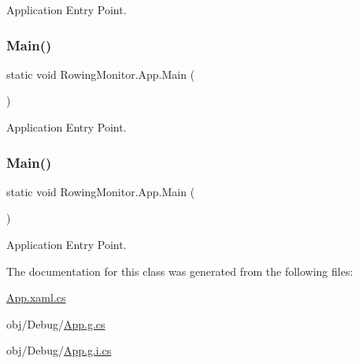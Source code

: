 Application Entry Point. 

\mbox{\label{class_rowing_monitor_1_1_app_a3cb5b8569d044cd9687827e6c2072b7e}} 
\subsubsection{\texorpdfstring{Main()}{Main()}\hspace{0.1cm}{\footnotesize\ttfamily [3/4]}}
{\footnotesize\ttfamily static void Rowing\+Monitor.\+App.\+Main (\begin{DoxyParamCaption}{ }\end{DoxyParamCaption})\hspace{0.3cm}{\ttfamily [static]}}



Application Entry Point. 

\mbox{\label{class_rowing_monitor_1_1_app_a3cb5b8569d044cd9687827e6c2072b7e}} 
\subsubsection{\texorpdfstring{Main()}{Main()}\hspace{0.1cm}{\footnotesize\ttfamily [4/4]}}
{\footnotesize\ttfamily static void Rowing\+Monitor.\+App.\+Main (\begin{DoxyParamCaption}{ }\end{DoxyParamCaption})\hspace{0.3cm}{\ttfamily [static]}}



Application Entry Point. 



The documentation for this class was generated from the following files\+:\begin{DoxyCompactItemize}
\item 
\hyperlink{_app_8xaml_8cs}{App.\+xaml.\+cs}\item 
obj/\+Debug/\hyperlink{_debug_2_app_8g_8cs}{App.\+g.\+cs}\item 
obj/\+Debug/\hyperlink{_debug_2_app_8g_8i_8cs}{App.\+g.\+i.\+cs}\end{DoxyCompactItemize}
